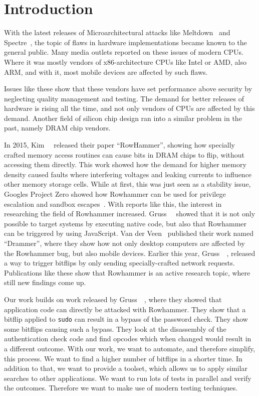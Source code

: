 \chapter{Introduction}\label{sec:intro}

With the latest releases of Microarchitectural attacks like
Meltdown~\cite{meltdown} and Spectre~\cite{spectre}, the topic of flaws in
hardware implementations became known to the general public. Many media outlets
reported on these issues of modern CPUs. Where it was mostly vendors of
x86-architecture CPUs like Intel or AMD, also ARM, and with it, most mobile
devices are affected by such flaws.

Issues like these show that these vendors have set performance above security by
neglecting quality management and testing. The demand for better releases of
hardware is rising all the time, and not only vendors of CPUs are affected by
this demand. Another field of silicon chip design ran into a similar problem in
the past, namely DRAM chip vendors.  

In 2015, Kim~\etal~\cite{rowhammergeneral} released their paper ``RowHammer'',
showing how specially crafted memory access routines can cause bits in DRAM
chips to flip, without accessing them directly. This work showed how the demand
for higher memory density caused faults where interfering voltages and leaking
currents to influence other memory storage cells. While at first, this was just
seen as a stability issue, Google\textquotesingle s Project Zero showed how
Rowhammer can be used for privilege escalation and sandbox
escapes~\cite{projectzerorow}. With reports like this, the interest in
researching the field of Rowhammer increased. Gruss~\etal~\cite{rowhammerjs}
showed that it is not only possible to target systems by executing native code,
but also that Rowhammer can be triggered by using JavaScript. Van der
Veen~\etal\cite{drammer} published their work named ``Drammer'', where they show
how not only desktop computers are affected by the Rowhammer bug, but also
mobile devices. Earlier this year, Gruss~\etal~\cite{nethammer}, released a way
to trigger bitflips by only sending specially-crafted network requests.
Publications like these show that Rowhammer is an active research topic, where
still new findings come up.

Our work builds on work released by Gruss~\etal~\cite{flipinthewall}, where they
showed that application code can directly be attacked with Rowhammer. They show
that a bitflip applied to \texttt{sudo} can result in a bypass of the password
check. They show some bitflips causing such a bypass. They look at the
disassembly of the authentication check code and find opcodes which when changed
would result in a different outcome. With our work, we want to automate, and
therefore simplify, this process. We want to find a higher number of bitflips in
a shorter time. In addition to that, we want to provide a toolset, which allows
us to apply similar searches to other applications. We want to run lots of tests
in parallel and verify the outcomes. Therefore we want to make use of modern
testing techniques.

